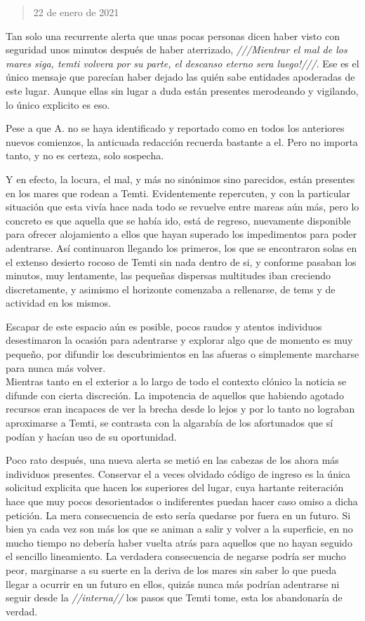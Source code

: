 \documentclass[
  spanish,
]{book}
\begin{document}
\begin{quote}
22 de enero de 2021
\end{quote}

Tan solo una recurrente alerta que unas pocas personas dicen haber visto con seguridad unos minutos después de haber aterrizado, \emph{///Mientrar el mal de los mares siga, temti volvera por su parte, el descanso eterno sera luego!///}. Ese es el único mensaje que parecían haber dejado las quién sabe entidades apoderadas de este lugar. Aunque ellas sin lugar a duda están presentes merodeando y vigilando, lo único explicito es eso.

Pese a que A. no se haya identificado y reportado como en todos los anteriores nuevos comienzos, la anticuada redacción recuerda bastante a el. Pero no importa tanto, y no es certeza, solo sospecha.

Y en efecto, la locura, el mal, y más no sinónimos sino parecidos, están presentes en los mares que rodean a Temti. Evidentemente repercuten, y con la particular situación que esta vivía hace nada todo se revuelve entre mareas aún más, pero lo concreto es que aquella que se había ido, está de regreso, nuevamente disponible para ofrecer alojamiento a ellos que hayan superado los impedimentos para poder adentrarse. Así continuaron llegando los primeros, los que se encontraron solas en el extenso desierto rocoso de Temti sin nada dentro de si, y conforme pasaban los minutos, muy lentamente, las pequeñas dispersas multitudes iban creciendo discretamente, y asimismo el horizonte comenzaba a rellenarse, de tems y de actividad en los mismos.

Escapar de este espacio aún es posible, pocos raudos y atentos individuos desestimaron la ocasión para adentrarse y explorar algo que de momento es muy pequeño, por difundir los descubrimientos en las afueras o simplemente marcharse para nunca más volver.\\
Mientras tanto en el exterior a lo largo de todo el contexto clónico la noticia se difunde con cierta discreción. La impotencia de aquellos que habiendo agotado recursos eran incapaces de ver la brecha desde lo lejos y por lo tanto no lograban aproximarse a Temti, se contrasta con la algarabía de los afortunados que sí podían y hacían uso de su oportunidad.

Poco rato después, una nueva alerta se metió en las cabezas de los ahora más individuos presentes. Conservar el a veces olvidado código de ingreso es la única solicitud explicita que hacen los superiores del lugar, cuya hartante reiteración hace que muy pocos desorientados o indiferentes puedan hacer caso omiso a dicha petición. La mera consecuencia de esto sería quedarse por fuera en un futuro. Si bien ya cada vez son más los que se animan a salir y volver a la superficie, en no mucho tiempo no debería haber vuelta atrás para aquellos que no hayan seguido el sencillo lineamiento. La verdadera consecuencia de negarse podría ser mucho peor, marginarse a su suerte en la deriva de los mares sin saber lo que pueda llegar a ocurrir en un futuro en ellos, quizás nunca más podrían adentrarse ni seguir desde la \emph{//interna//} los pasos que Temti tome, esta los abandonaría de verdad.
\end{document}
